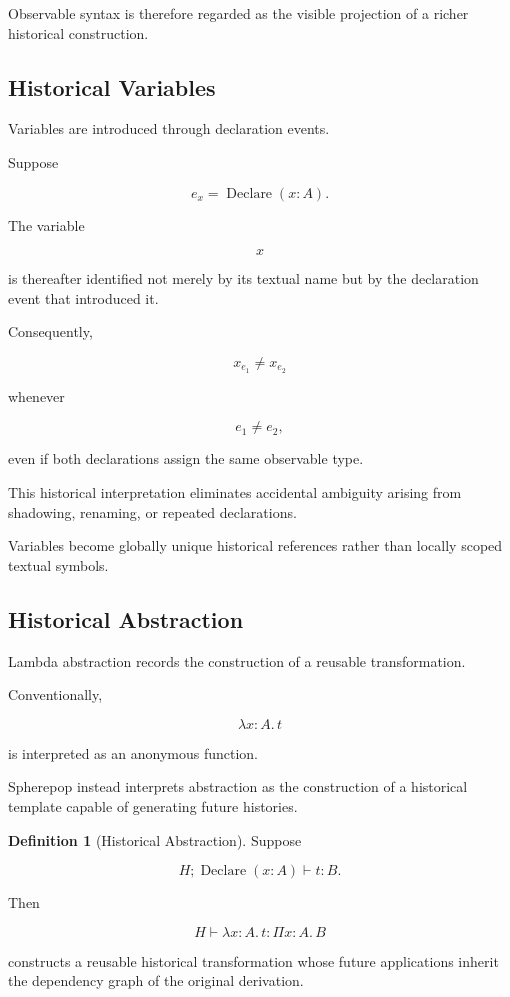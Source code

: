 \documentclass[12pt,oneside]{article}
\theoremstyle{definition}
\newtheorem{definition}[theorem]{Definition}
\theoremstyle{remark}
\begin{document}
Observable syntax is therefore regarded as the visible projection of a richer
historical construction.

\subsection{Historical Variables}

Variables are introduced through declaration events.

Suppose

\[
e_x
=
\operatorname{Declare}(x:A).
\]

The variable

\[
x
\]

is thereafter identified not merely by its textual name but by the declaration
event that introduced it.

Consequently,

\[
x_{e_1}
\neq
x_{e_2}
\]

whenever

\[
e_1
\neq
e_2,
\]

even if both declarations assign the same observable type.

This historical interpretation eliminates accidental ambiguity arising from
shadowing, renaming, or repeated declarations.

Variables become globally unique historical references rather than locally
scoped textual symbols.

\subsection{Historical Abstraction}

Lambda abstraction records the construction of a reusable transformation.

Conventionally,

\[
\lambda x:A.\,t
\]

is interpreted as an anonymous function.

Spherepop instead interprets abstraction as the construction of a historical
template capable of generating future histories.

\begin{definition}[Historical Abstraction]

Suppose

\[
H;
\operatorname{Declare}(x:A)
\vdash
t:B.
\]

Then

\[
H
\vdash
\lambda x:A.\,t
:
\Pi x:A.\,B
\]

constructs a reusable historical transformation whose future applications
inherit the dependency graph of the original derivation.

\end{definition}
\end{document}
